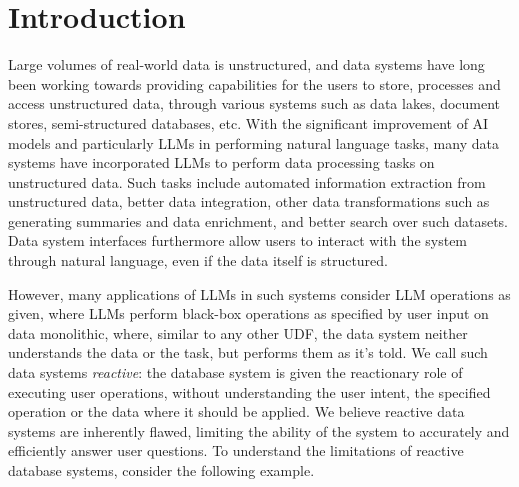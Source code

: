\section{Introduction}





Large volumes of real-world data is unstructured, and data systems have long been working towards providing capabilities for the users to store, processes and access unstructured data, through various systems such as data lakes, document stores, semi-structured databases, etc. With the significant improvement of AI models and particularly LLMs in performing natural language tasks, many data systems have incorporated LLMs to perform data processing tasks on unstructured data. Such tasks include automated information extraction from unstructured data, better data integration, other data transformations such as generating summaries and data enrichment, and better search over such datasets. Data system interfaces furthermore allow users to interact with the system through natural language, even if the data itself is structured.

However, many applications of LLMs in such systems consider LLM operations as given, where LLMs perform black-box operations as specified by user input on data monolithic, where, similar to any other UDF, the data system neither understands the data or the task, but performs them as it's told. We call such data systems \textit{reactive}: the database system is given the reactionary role of executing user operations, without understanding the user intent, the specified operation or the data where it should be applied. We believe reactive data systems are inherently flawed, limiting the ability of the system to accurately and efficiently answer user questions. To understand the limitations of reactive database systems, consider the following example. 

